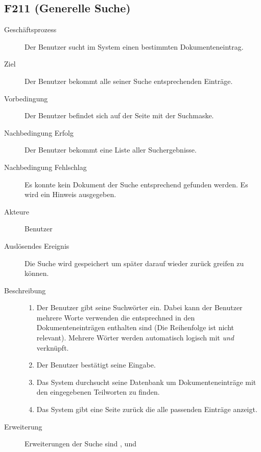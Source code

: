 \subsection{F211 (Generelle Suche)}
\label{F:Suche}
\begin{description}
  \item[Geschäftsprozess]Der Benutzer sucht im System einen bestimmten Dokumenteneintrag.
  \item[Ziel]Der Benutzer bekommt alle seiner Suche entsprechenden Einträge.
  \item[Vorbedingung]Der Benutzer befindet sich auf der Seite mit der Suchmaske.
  \item[Nachbedingung Erfolg]Der Benutzer bekommt eine Liste aller Suchergebnisse.
  \item[Nachbedingung Fehlschlag]Es konnte kein Dokument der Suche entsprechend gefunden werden. Es wird ein Hinweis ausgegeben.
  \item[Akteure]Benutzer
  \item[Auslösendes Ereignis]Die Suche wird gespeichert um später darauf wieder zurück greifen zu können.
  \item[Beschreibung]\hfill
    \begin{enumerate}
      \item Der Benutzer gibt seine Suchwörter ein. Dabei kann der Benutzer mehrere Worte verwenden die entsprechned in den Dokumenteneinträgen enthalten sind (Die Reihenfolge ist nicht relevant). Mehrere Wörter werden automatisch logisch mit \emph{und} verknüpft.
      \item Der Benutzer bestätigt seine Eingabe.
      \item Das System durchsucht seine Datenbank um Dokumenteneinträge mit den eingegebenen Teilworten zu finden.
      \item Das System gibt eine Seite zurück die alle passenden Einträge anzeigt.
    \end{enumerate}
    \item[Erweiterung]Erweiterungen der Suche sind ,  und 
\end{description}


